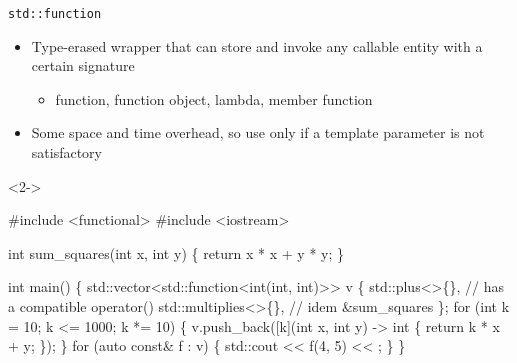 \begin{frame}[fragile]{\texttt{std::function}}
  \begin{itemize}
  \item Type-erased wrapper that can store and invoke any callable entity with a certain signature
    \begin{itemize}
    \item function, function object, lambda, member function
    \end{itemize}
  \item Some space and time overhead, so use only if a template parameter is not satisfactory
  \end{itemize}

  \begin{codeblock}<2->{
#include <functional>
#include <iostream>

\alert{int} sum\_squares\alert{(int} x\alert{, int} y\alert{)} \{ return x * x + y * y; \}

int main() \{
  std::vector<std::function<\alert{int(int, int)}>{}> v \{
    std::plus<>\{\},       // has a compatible operator()
    std::multiplies<>\{\}, // idem
    \&sum\_squares
  \};
  for (int k = 10; k <= 1000; k *= 10) \{
    v.push\_back([k]\alert{(int} x\alert{, int} y\alert{)} -> \alert{int} \{ return k * x + y; \});
  \}
  for (auto const\& f : v) \{ std::cout <{}< f(4, 5) <{}< \bslashn; \}
\}}\end{codeblock}

\end{frame}
